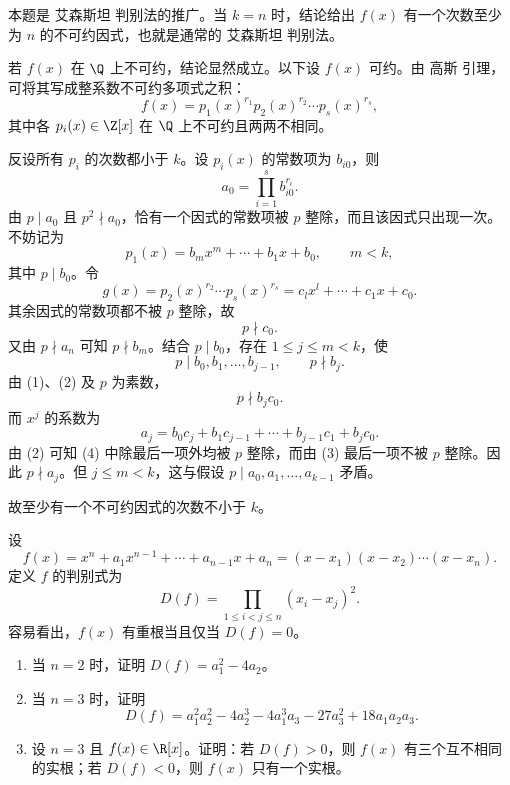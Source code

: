 \begin{solution}
	本题是 艾森斯坦 判别法的推广。当 \(k=n\) 时，结论给出 \(f(x)\) 有一个次数至少为 \(n\) 的不可约因式，也就是通常的 艾森斯坦 判别法。
	
	若 \(f(x)\) 在 \(\Q\) 上不可约，结论显然成立。以下设 \(f(x)\) 可约。由 高斯 引理，可将其写成整系数不可约多项式之积：
	\[
	f(x)=p_1(x)^{r_1}p_2(x)^{r_2}\cdots p_s(x)^{r_s},
	\]
	其中各 \(p_i(x)\in\Z[x]\) 在 \(\Q\) 上不可约且两两不相同。
	
	反设所有 \(p_i\) 的次数都小于 \(k\)。设 \(p_i(x)\) 的常数项为 \(b_{i0}\)，则
	\[
	a_0=\prod_{i=1}^s b_{i0}^{r_i}.
	\]
	由 \(p\mid a_0\) 且 \(p^2\nmid a_0\)，恰有一个因式的常数项被 \(p\) 整除，而且该因式只出现一次。不妨记为
	\[
	p_1(x)=b_mx^m+\cdots+b_1x+b_0,
	\qquad m<k,
	\]
	其中 \(p\mid b_0\)。令
	\[
	g(x)=p_2(x)^{r_2}\cdots p_s(x)^{r_s}
	=c_lx^l+\cdots+c_1x+c_0.
	\]
	其余因式的常数项都不被 \(p\) 整除，故
	\begin{equation}
		p\nmid c_0.
		\tag{1}
	\end{equation}
	又由 \(p\nmid a_n\) 可知 \(p\nmid b_m\)。结合 \(p\mid b_0\)，存在 \(1\le j\le m<k\)，使
	\begin{equation}
		p\mid b_0,b_1,\ldots,b_{j-1},
		\qquad p\nmid b_j.
		\tag{2}
	\end{equation}
	由 (1)、(2) 及 \(p\) 为素数，
	\begin{equation}
		p\nmid b_jc_0.
		\tag{3}
	\end{equation}
	而 \(x^j\) 的系数为
	\begin{equation}
		a_j=b_0c_j+b_1c_{j-1}+\cdots+b_{j-1}c_1+b_jc_0.
		\tag{4}
	\end{equation}
	由 (2) 可知 (4) 中除最后一项外均被 \(p\) 整除，而由 (3) 最后一项不被 \(p\) 整除。因此 \(p\nmid a_j\)。但 \(j\le m<k\)，这与假设 \(p\mid a_0,a_1,\ldots,a_{k-1}\) 矛盾。
	
	故至少有一个不可约因式的次数不小于 \(k\)。
\end{solution}

\begin{problem}
	 设
	\[
	f(x)=x^n+a_1x^{n-1}+\cdots+a_{n-1}x+a_n
	=(x-x_1)(x-x_2)\cdots(x-x_n).
	\]
	定义 \(f\) 的判别式为
	\[
	D(f)=\prod_{1\le i<j\le n}(x_i-x_j)^2.
	\]
	容易看出，\(f(x)\) 有重根当且仅当 \(D(f)=0\)。
	\begin{enumerate}
		\item 当 \(n=2\) 时，证明 \(D(f)=a_1^2-4a_2\)。
		\item 当 \(n=3\) 时，证明
		\[
		D(f)=a_1^2a_2^2-4a_2^3-4a_1^3a_3-27a_3^2+18a_1a_2a_3.
		\]
		\item 设 \(n=3\) 且 \(f(x)\in\R[x]\)。证明：若 \(D(f)>0\)，则 \(f(x)\) 有三个互不相同的实根；若 \(D(f)<0\)，则 \(f(x)\) 只有一个实根。
	\end{enumerate}
\end{problem}

